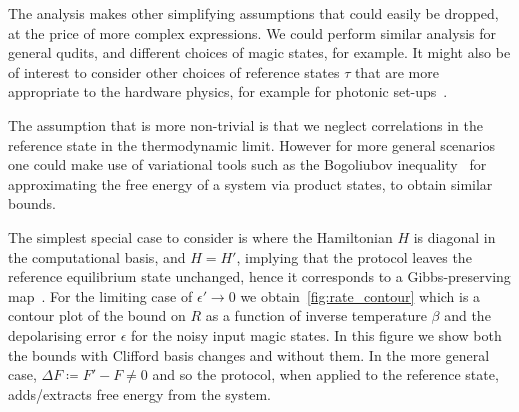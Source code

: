 \documentclass[pra,
aps,
twocolumn,
superscriptaddress,
groupedaddress,
nofootinbib,
reprint
]{revtex4-1}
\begin{document}
The analysis makes other simplifying assumptions that could easily be dropped, at the price of more complex expressions. We could perform similar analysis for general qudits, and different choices of magic states, for example. It might also be of interest to consider other choices of reference states $\tau$ that are more appropriate to the hardware physics, for example for photonic set-ups~\cite{bombin2021interleaving}.

The assumption that is more non-trivial is that we neglect correlations in the reference state in the thermodynamic limit. However for more general scenarios one could make use of variational tools such as the Bogoliubov inequality~\cite{bogolyubov_1966} for approximating the free energy of a system via product states, to obtain similar bounds.




The simplest special case to consider is where the Hamiltonian $H$ is diagonal in the computational basis, and $H=H'$, implying that the protocol leaves the reference equilibrium state unchanged, hence it corresponds to a Gibbs-preserving map~\cite{faist_2015}. For the limiting case of $\epsilon' \rightarrow 0$ we obtain~\cref{fig:rate_contour} which is a contour plot of the bound on $R$ as a function of inverse temperature $\beta$ and the depolarising error $\epsilon$ for the noisy input magic states. In this figure we show both the bounds with Clifford basis changes and without them. In the more general case, $\Delta F \coloneqq F' - F \ne 0$ and so the protocol, when applied to the reference state, adds/extracts free energy from the system. 


%


\end{document}
